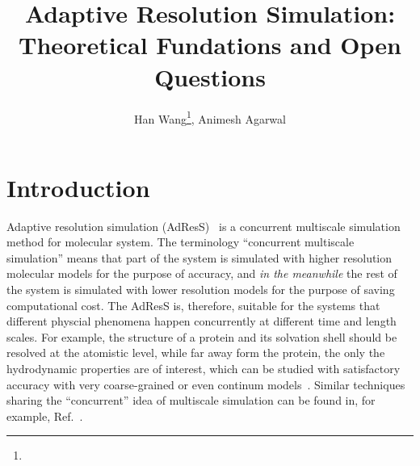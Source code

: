 \documentclass[epjST]{svjour}
\begin{document}
%
\title{Adaptive Resolution Simulation: Theoretical Fundations and Open Questions}
\author{Han Wang\fnmsep\thanks{}, Animesh Agarwal}
%
%
%
\maketitle
%

\section{Introduction}

Adaptive resolution simulation (AdResS)~\cite{praprotnik2005adaptive,praprotnik2006adaptive,praprotnik2007adaptive,praprotnik2008multiscale,poblete2010coupling,praprotnik2011statistical,fritsch2012adaptive,bevc2013adaptive} is a concurrent multiscale simulation method for molecular system.
The terminology ``concurrent multiscale simulation'' means that
part of the system is simulated with higher resolution molecular models for the
purpose of accuracy, and \emph{in the meanwhile} the rest of the system is
simulated with lower resolution models for the purpose of saving computational cost.
The AdResS is, therefore, suitable for the systems that different physcial
phenomena happen concurrently at different time and length scales. For example,
the structure of a protein and its solvation shell
should be resolved at the atomistic level, while far away form the protein,
the only the hydrodynamic properties are of interest, which can be studied with satisfactory
accuracy with very coarse-grained or even continum
models~\cite{zavadlav2014adaptive,zavadlav2014adaptive1,delgado2009coupling}.
Similar  
techniques sharing the ``concurrent'' idea of multiscale simulation can be found in, for example, Ref.~\cite{ensing2007energy,heyes2010thermodynamic,shi2006mixed,shen2014resolution,nielsen2010adaptive}.
\end{document}

